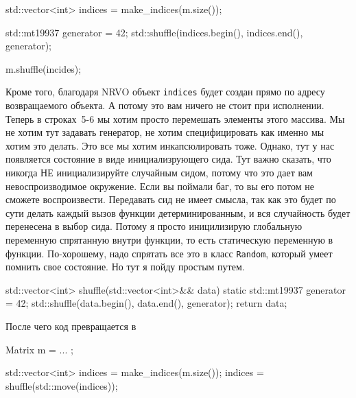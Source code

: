 \begin{enumerate}
\begin{cppcode}
std::vector<int> indices  = make_indices(m.size());

std::mt19937 generator = 42;
std::shuffle(indices.begin(), indices.end(), generator);

m.shuffle(incides);
\end{cppcode}
Кроме того, благодаря NRVO объект \verb"indices" будет создан прямо по адресу возвращаемого объекта.
А потому это вам ничего не стоит при исполнении.
Теперь в строках~5-6 мы хотим просто перемешать элементы этого массива.
Мы не хотим тут задавать генератор, не хотим специфицировать как именно мы хотим это делать.
Это все мы хотим инкапсюлировать тоже.
Однако, тут у нас появляется состояние в виде инициализрующего сида.
Тут важно сказать, что никогда НЕ инициализируйте случайным сидом, потому что это дает вам невоспроизводимое окружение.
Если вы поймали баг, то вы его потом не сможете воспроизвести.
Передавать сид не имеет смысла, так как это будет по сути делать каждый вызов функции детерминированным, и вся случайность будет перенесена в выбор сида.
Потому я просто иницилизирую глобальную переменную спрятанную внутри функции, то есть статическую переменную в функции.
По-хорошему, надо спрятать все это в класс \verb"Random", который умеет помнить свое состояние.
Но тут я пойду простым путем.
\begin{cppcode}
std::vector<int> shuffle(std::vector<int>&& data) {
  static std::mt19937 generator = 42;
  std::shuffle(data.begin(), data.end(), generator);
  return data;
}
\end{cppcode}
После чего код превращается в
\begin{cppcode}
Matrix m = ... ;

std::vector<int> indices  = make_indices(m.size());
indices = shuffle(std::move(indices));


\end{cppcode}
\end{enumerate}
